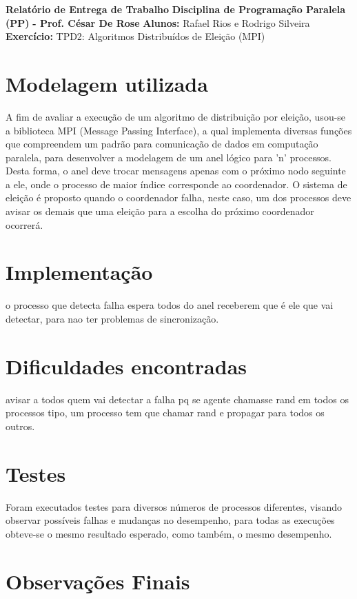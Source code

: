\documentclass{article}
\begin{document}
\textbf{Relatório de Entrega de Trabalho} \newline
\textbf{Disciplina de Programação Paralela (PP)}\textbf{ - Prof. César De Rose} \newline
\textbf{Alunos:} Rafael Rios e Rodrigo Silveira \newline
\textbf{Exercício:} TPD2: Algoritmos Distribuídos de Eleição (MPI) \newline

\begin{multicols*}{2}

\section{Modelagem utilizada}
A fim de avaliar a execução de um algoritmo de distribuição por eleição, usou-se a biblioteca MPI (Message Passing Interface), a qual implementa diversas funções que compreendem um padrão para comunicação de dados em computação paralela, para desenvolver a modelagem de um anel lógico para 'n' processos. Desta forma, o anel deve trocar mensagens apenas com o próximo nodo seguinte a ele, onde o processo de maior índice corresponde ao coordenador. O sistema de eleição é proposto quando o coordenador falha, neste caso, um dos processos deve avisar os demais que uma eleição para a escolha do próximo coordenador ocorrerá. \newline


\section{Implementação}

o processo que detecta falha espera todos do anel receberem que é ele que vai detectar, para nao ter problemas de sincronização.


\section{Dificuldades encontradas}
avisar a todos quem vai detectar a falha pq se agente chamasse rand em todos os processos tipo, um processo tem que chamar rand e propagar para todos os outros.


\section{Testes}
Foram executados testes para diversos números de processos diferentes, visando observar possíveis falhas e mudanças no desempenho, para todas as execuções obteve-se o mesmo resultado esperado, como também, o mesmo desempenho.


\section{Observações Finais}



\end{multicols*}
\end{document}
